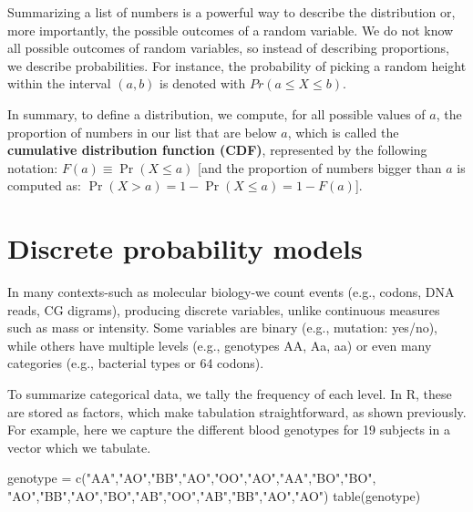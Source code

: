 \documentclass[
  letterpaper,
  DIV=11,
  numbers=noendperiod]{scrreprt}
\newenvironment{Shaded}{\begin{snugshade}}{\end{snugshade}}
\newcommand{\FunctionTok}[1]{\textcolor[rgb]{0.28,0.35,0.67}{#1}}
\newcommand{\NormalTok}[1]{\textcolor[rgb]{0.00,0.23,0.31}{#1}}
\newcommand{\OtherTok}[1]{\textcolor[rgb]{0.00,0.23,0.31}{#1}}
\newcommand{\StringTok}[1]{\textcolor[rgb]{0.13,0.47,0.30}{#1}}
\begin{document}
Summarizing a list of numbers is a powerful way to describe the
distribution or, more importantly, the possible outcomes of a random
variable. We do not know all possible outcomes of random variables, so
instead of describing proportions, we describe probabilities. For
instance, the probability of picking a random height within the interval
\((a,b)\) is denoted with \(Pr(a \leq X \leq b)\).

In summary, to define a distribution, we compute, for all possible
values of \(a\), the proportion of numbers in our list that are below
\(a\), which is called the \textbf{cumulative distribution function
(CDF)}, represented by the following notation:
\(F(a) \equiv \Pr(X \leq a)\) {[}and the proportion of numbers bigger
than \(a\) is computed as: \(\Pr(X \gt a)=1-\Pr(X \leq a)=1-F(a)\){]}.

\section{Discrete probability models}\label{discrete-probability-models}

In many contexts-such as molecular biology-we count events (e.g.,
codons, DNA reads, CG digrams), producing discrete variables, unlike
continuous measures such as mass or intensity. Some variables are binary
(e.g., mutation: yes/no), while others have multiple levels (e.g.,
genotypes AA, Aa, aa) or even many categories (e.g., bacterial types or
64 codons).

To summarize categorical data, we tally the frequency of each level. In
R, these are stored as factors, which make tabulation straightforward,
as shown previously. For example, here we capture the different blood
genotypes for 19 subjects in a vector which we tabulate.

\begin{Shaded}
\begin{Highlighting}[]
\NormalTok{genotype }\OtherTok{=} \FunctionTok{c}\NormalTok{(}\StringTok{"AA"}\NormalTok{,}\StringTok{"AO"}\NormalTok{,}\StringTok{"BB"}\NormalTok{,}\StringTok{"AO"}\NormalTok{,}\StringTok{"OO"}\NormalTok{,}\StringTok{"AO"}\NormalTok{,}\StringTok{"AA"}\NormalTok{,}\StringTok{"BO"}\NormalTok{,}\StringTok{"BO"}\NormalTok{,}
             \StringTok{"AO"}\NormalTok{,}\StringTok{"BB"}\NormalTok{,}\StringTok{"AO"}\NormalTok{,}\StringTok{"BO"}\NormalTok{,}\StringTok{"AB"}\NormalTok{,}\StringTok{"OO"}\NormalTok{,}\StringTok{"AB"}\NormalTok{,}\StringTok{"BB"}\NormalTok{,}\StringTok{"AO"}\NormalTok{,}\StringTok{"AO"}\NormalTok{)}
\FunctionTok{table}\NormalTok{(genotype)}
\end{Highlighting}
\end{Shaded}
\end{document}
